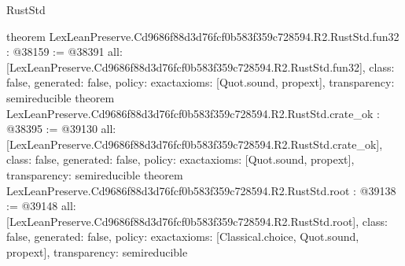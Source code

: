 \begin{lexlean}{RustStd}
\begin{coremodule}
{}
theorem LexLeanPreserve.Cd9686f88d3d76fcf0b583f359c728594.R2.RustStd.fun32 : @38159 := @38391 {
  all: [LexLeanPreserve.Cd9686f88d3d76fcf0b583f359c728594.R2.RustStd.fun32],
  class: false,
  generated: false,
  policy: exact{axioms: [Quot.sound, propext]},
  transparency: semireducible
}
theorem LexLeanPreserve.Cd9686f88d3d76fcf0b583f359c728594.R2.RustStd.crate_ok : @38395 := @39130 {
  all: [LexLeanPreserve.Cd9686f88d3d76fcf0b583f359c728594.R2.RustStd.crate_ok],
  class: false,
  generated: false,
  policy: exact{axioms: [Quot.sound, propext]},
  transparency: semireducible
}
theorem LexLeanPreserve.Cd9686f88d3d76fcf0b583f359c728594.R2.RustStd.root : @39138 := @39148 {
  all: [LexLeanPreserve.Cd9686f88d3d76fcf0b583f359c728594.R2.RustStd.root],
  class: false,
  generated: false,
  policy: exact{axioms: [Classical.choice, Quot.sound, propext]},
  transparency: semireducible
}


\end{coremodule}
\end{lexlean}
